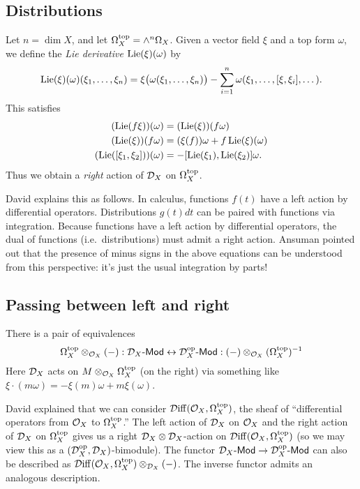 \documentclass{article}
\begin{document}
\subsection{Distributions}

Let $n = \dim X$, and let $\Omega_X^{\mathrm{top}} = \wedge^n \Omega_X$.
Given a vector field $\xi$ and a top form $\omega$, we define the \emph{Lie derivative} $\operatorname{Lie}(\xi)(\omega)$ by
\[
	\operatorname{Lie}(\xi)(\omega)(\xi_1, \dots, \xi_n) = \xi\big(\omega(\xi_1, \dots, \xi_n)\big) - \sum_{i=1}^n \omega(\xi_1, \dots, [\xi, \xi_i], \dots).
\]
This satisfies
\begin{align*}
	(\operatorname{Lie}(f\xi))(\omega) &= (\operatorname{Lie}(\xi))(f\omega) \\
	(\operatorname{Lie}(\xi))(f\omega) &= (\xi(f)) \omega + f \operatorname{Lie}(\xi)(\omega) \\
	(\operatorname{Lie}([\xi_1, \xi_2]))(\omega) &= -[\operatorname{Lie}(\xi_1), \operatorname{Lie}(\xi_2)] \omega.
\end{align*}
Thus we obtain a \emph{right} action of $\mathcal{D}_X$ on $\Omega_X^{\mathrm{top}}$.

\begin{rmk}
	David explains this as follows.
	In calculus, functions $f(t)$ have a left action by differential operators.
	Distributions $g(t) dt$ can be paired with functions via integration.
	Because functions have a left action by differential operators, the dual of functions (i.e.\ distributions) must admit a right action.
	Ansuman pointed out that the presence of minus signs in the above equations can be understood from this perspective: it's just the usual integration by parts!
\end{rmk}

\subsection{Passing between left and right}

There is a pair of equivalences
\[
	\Omega_X^{\mathrm{top}} \otimes_{\mathcal{O}_X} (-): \mathcal{D}_X\text{-}\mathsf{Mod} \leftrightarrow \mathcal{D}_X^{\mathrm{op}}\text{-}\mathsf{Mod} :(-) \otimes_{\mathcal{O}_X} (\Omega_X^{\mathrm{top}})^{-1}
\]
Here $\mathcal{D}_X$ acts on $M \otimes_{\mathcal{O}_X} \Omega_X^{\mathrm{top}}$ (on the right) via something like $\xi \cdot (m \omega) = -\xi(m) \omega + m \xi(\omega)$.

\begin{rmk}
	David explained that we can consider $\mathcal{D}\mathrm{iff}(\mathcal{O}_X, \Omega_X^{\mathrm{top}})$, the sheaf of ``differential operators from $\mathcal{O}_X$ to $\Omega_X^{\mathrm{top}}$.''
	The left action of $\mathcal{D}_X$ on $\mathcal{O}_X$ and the right action of $\mathcal{D}_X$ on $\Omega_X^{\mathrm{top}}$ gives us a right $\mathcal{D}_X \otimes \mathcal{D}_X$-action on $\mathcal{D}\mathrm{iff}(\mathcal{O}_X, \Omega_X^{\mathrm{top}})$ (so we may view this as a $(\mathcal{D}_X^{\mathrm{op}}, \mathcal{D}_X)$-bimodule).
	The functor $\mathcal{D}_X\text{-}\mathsf{Mod} \to \mathcal{D}_X^{\mathrm{op}}\text{-}\mathsf{Mod}$ can also be described as $\mathcal{D}\mathrm{iff}(\mathcal{O}_X, \Omega_X^{\mathrm{top}}) \otimes_{\mathcal{D}_X} (-)$.
	The inverse functor admits an analogous description.
\end{rmk}
\end{document}
